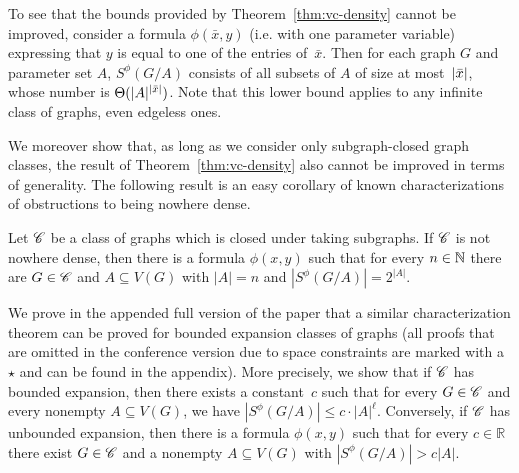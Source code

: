 To see that the bounds provided by Theorem~\ref{thm:vc-density} cannot be improved, consider a formula $\phi(\bar x,y)$ (i.e. with one parameter variable) expressing that $y$ is equal to one of the entries of~$\bar x$. Then for each graph $G$ and parameter set $A$, $S^{\phi}(G/A)$ consists of all subsets of $A$ of size at most~$|\bar{x}|$, whose number is $\Theta(|A|^{|\bar{x}|})$. Note that
this lower bound applies to any infinite class of graphs, even edgeless ones.

We moreover show that, as long as we consider only subgraph-closed graph classes, the result of Theorem~\ref{thm:vc-density} also cannot be improved in terms of generality.
The following result is an easy corollary of known characterizations of obstructions to being nowhere dense.

   \begin{theorem}\label{thm:vc-density-lower-bound}
  Let $\mathscr{C}$ be a class of graphs which 
  is closed under taking subgraphs. 
   If $\mathscr{C}$ is not nowhere dense, then there is a formula 
  $\phi(x,y)$ such that for every $n\in \mathbb{N}$ there are $G\in\mathscr{C}$ and $A\subseteq V(G)$ 
  with $|A|=n$ and $|S^\phi(G/A)|=2^{|A|}$. 
\end{theorem}

We prove in the appended full version of the paper that a similar
characterization theorem can be proved for bounded
expansion classes of graphs (all proofs that are omitted
in the conference version due 
to space constraints are marked with a $\star$ and can be 
found in the appendix). More precisely, we show that 
if $\mathscr{C}$ has bounded 
expansion, then there exists a constant~$c$ such that for every 
$G\in \mathscr{C}$ and every nonempty $A\subseteq V(G)$, we have 
$|S^\phi(G/A)|\leq c\cdot |A|^\ell$. Conversely, if $\mathscr{C}$ has 
unbounded expansion, then there is a formula $\phi(x,y)$ such 
that for every $c\in \mathbb{R}$ there exist $G\in\mathscr{C}$ and 
a nonempty $A\subseteq V(G)$ with $|S^\phi(G/A)|>c|A|$. 

